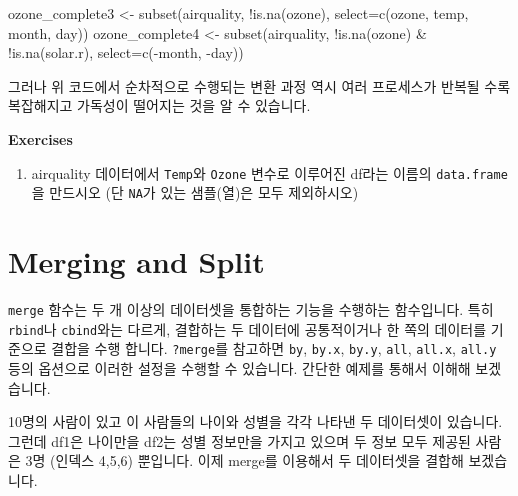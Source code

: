 \documentclass[
  a4paper,
]{book}
\newenvironment{Shaded}{\begin{snugshade}}{\end{snugshade}}
\newcommand{\AttributeTok}[1]{\textcolor[rgb]{0.40,0.45,0.13}{#1}}
\newcommand{\FunctionTok}[1]{\textcolor[rgb]{0.28,0.35,0.67}{#1}}
\newcommand{\NormalTok}[1]{\textcolor[rgb]{0.00,0.23,0.31}{#1}}
\newcommand{\OtherTok}[1]{\textcolor[rgb]{0.00,0.23,0.31}{#1}}
\newcommand{\SpecialCharTok}[1]{\textcolor[rgb]{0.37,0.37,0.37}{#1}}
\providecommand{\tightlist}{%
  \setlength{\itemsep}{0pt}\setlength{\parskip}{0pt}}\usepackage{longtable,booktabs,array}
\begin{document}
\begin{Shaded}
\begin{Highlighting}[]
\NormalTok{ozone\_complete3 }\OtherTok{\textless{}{-}} \FunctionTok{subset}\NormalTok{(airquality, }\SpecialCharTok{!}\FunctionTok{is.na}\NormalTok{(ozone), }\AttributeTok{select=}\FunctionTok{c}\NormalTok{(ozone, temp, month, day))}
\NormalTok{ozone\_complete4 }\OtherTok{\textless{}{-}} \FunctionTok{subset}\NormalTok{(airquality, }\SpecialCharTok{!}\FunctionTok{is.na}\NormalTok{(ozone) }\SpecialCharTok{\&} \SpecialCharTok{!}\FunctionTok{is.na}\NormalTok{(solar.r), }\AttributeTok{select=}\FunctionTok{c}\NormalTok{(}\SpecialCharTok{{-}}\NormalTok{month, }\SpecialCharTok{{-}}\NormalTok{day))}
\end{Highlighting}
\end{Shaded}

그러나 위 코드에서 순차적으로 수행되는 변환 과정 역시 여러 프로세스가
반복될 수록 복잡해지고 가독성이 떨어지는 것을 알 수 있습니다.

\textbf{Exercises}

\begin{enumerate}
\def\labelenumi{\arabic{enumi})}
\tightlist
\item
  airquality 데이터에서 \texttt{Temp}와 \texttt{Ozone} 변수로 이루어진
  df라는 이름의 \texttt{data.frame}을 만드시오 (단 \texttt{NA}가 있는
  샘플(열)은 모두 제외하시오)
\end{enumerate}

\hypertarget{merging-and-split}{%
\section{Merging and Split}\label{merging-and-split}}

\texttt{merge} 함수는 두 개 이상의 데이터셋을 통합하는 기능을 수행하는
함수입니다. 특히 \texttt{rbind}나 \texttt{cbind}와는 다르게, 결합하는 두
데이터에 공통적이거나 한 쪽의 데이터를 기준으로 결합을 수행 합니다.
\texttt{?merge}를 참고하면 \texttt{by}, \texttt{by.x}, \texttt{by.y},
\texttt{all}, \texttt{all.x}, \texttt{all.y} 등의 옵션으로 이러한 설정을
수행할 수 있습니다. 간단한 예제를 통해서 이해해 보겠습니다.

10명의 사람이 있고 이 사람들의 나이와 성별을 각각 나타낸 두 데이터셋이
있습니다. 그런데 df1은 나이만을 df2는 성별 정보만을 가지고 있으며 두
정보 모두 제공된 사람은 3명 (인덱스 4,5,6) 뿐입니다. 이제 merge를
이용해서 두 데이터셋을 결합해 보겠습니다.
\end{document}
